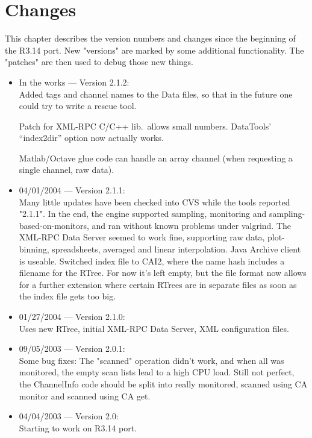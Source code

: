 \chapter{Changes}

This chapter describes the version numbers and changes since
the beginning of the R3.14 port.
New  "versions"  are  marked  by some additional functionality. The
"patches" are then used to debug those new things.

\begin{itemize}

\item In the works --- Version 2.1.2:\\
Added tags and channel names to the Data files,
so that in the future one could try to write
a rescue tool.

Patch for XML-RPC C/C++ lib.\ allows small numbers.
DataTools' ``index2dir'' option now actually works.

Matlab/Octave glue code can handle an array channel
(when requesting a single channel, raw data).

\item 04/01/2004 --- Version 2.1.1:\\
Many little updates have been checked into CVS
while the tools reported "2.1.1".
In the end, the engine supported sampling, monitoring
and sampling-based-on-monitors, and ran without known problems
under valgrind.
The XML-RPC Data Server seemed to work fine, supporting
raw data, plot-binning, spreadsheets, averaged and linear interpolation.
Java Archive client is useable.
Switched index file to CAI2, where the name hash includes a filename
for the RTree. For now it's left empty, but the file format now
allows for a further extension where certain RTrees are in separate
files as soon as the index file gets too big.

\item 01/27/2004 --- Version 2.1.0:\\
Uses new RTree, initial XML-RPC Data Server, XML configuration files.

\item 09/05/2003 --- Version 2.0.1:\\
Some bug fixes:
The  "scanned"  operation didn't work, and when all was monitored,
the  empty  scan lists lead to a high CPU load. Still not perfect,
the  ChannelInfo  code  should  be  split  into  really monitored,
scanned using CA monitor and scanned using CA get.

\item 04/04/2003 --- Version 2.0:\\
Starting to work on R3.14 port.
\end{itemize}
